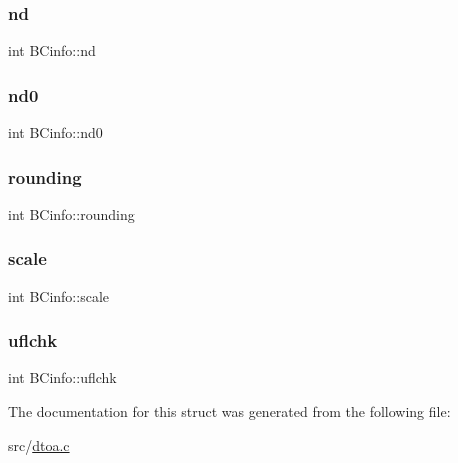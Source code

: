 \subsubsection{\texorpdfstring{nd}{nd}}
{\footnotesize\ttfamily int B\+Cinfo\+::nd}

\mbox{\label{struct_b_cinfo_a9d30accd41a03e88ebd52591258b76fa}} 
\subsubsection{\texorpdfstring{nd0}{nd0}}
{\footnotesize\ttfamily int B\+Cinfo\+::nd0}

\mbox{\label{struct_b_cinfo_af42ca3177f8bd75dfe6435461332e748}} 
\subsubsection{\texorpdfstring{rounding}{rounding}}
{\footnotesize\ttfamily int B\+Cinfo\+::rounding}

\mbox{\label{struct_b_cinfo_a59b720f0388e80e21b950723aa53b56e}} 
\subsubsection{\texorpdfstring{scale}{scale}}
{\footnotesize\ttfamily int B\+Cinfo\+::scale}

\mbox{\label{struct_b_cinfo_a637b7e41de9291f100fdcc60267c222b}} 
\subsubsection{\texorpdfstring{uflchk}{uflchk}}
{\footnotesize\ttfamily int B\+Cinfo\+::uflchk}



The documentation for this struct was generated from the following file\+:\begin{DoxyCompactItemize}
\item 
src/\hyperlink{dtoa_8c}{dtoa.\+c}\end{DoxyCompactItemize}

